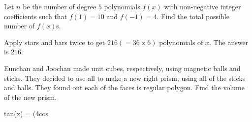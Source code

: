 \begin{problem}
Let $n$ be the number of degree $5$ polynomials $f(x)$ with non-negative integer coefficients such that $f(1)=10$ and $f(-1)=4$. Find the total possible number of $f(x)$s.
\end{problem}

\begin{solution}
Apply stars and bars twice to get $216(=36\times6)$ polynomials of $x$. The answer is $216$.
\end{solution}

\begin{problem}
Eunchan and Joochan made unit cubes, respectively, using magnetic balls and sticks. They decided to use all to make a new right prism, using all of the sticks and balls. They found out each of the faces is regular polygon. Find the volume of the new prism.
\end{problem}

\begin{problem}
tan(x) = (4cos
\end{problem}